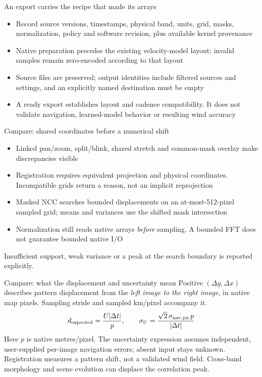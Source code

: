 \documentclass[aspectratio=169,11pt]{beamer}
\newcommand{\currevsec}{}
\newcommand{\revsec}[1]{\gdef\currevsec{#1}}
\begin{document}
\begin{frame}{An export carries the recipe that made its arrays}
  \revsec{4.19}
\begin{itemize}
    \item Record source versions, timestamps, physical band, units, grid, masks, normalization, policy and software revision, plus available kernel provenance
    \item Native preparation precedes the existing velocity-model layout; invalid samples remain zero-encoded according to that layout
    \item Source files are preserved; output identities include filtered sources and settings, and an explicitly named destination must be empty
    \item A ready export establishes layout and cadence compatibility. It does not validate navigation, learned-model behavior or resulting wind accuracy
  \end{itemize}
\end{frame}

\begin{frame}{Compare: shared coordinates before a numerical shift}
  \revsec{4.19}
\begin{itemize}
    \item Linked pan/zoom, split/blink, shared stretch and common-mask overlay make discrepancies visible
    \item Registration requires equivalent projection and physical coordinates. Incompatible grids return a reason, not an implicit reprojection
    \item Masked NCC searches bounded displacements on an at-most-512-pixel sampled grid; means and variances use the shifted mask intersection
    \item Normalization still reads native arrays \emph{before} sampling. A bounded FFT does not guarantee bounded native I/O
  \end{itemize}
  Insufficient support, weak variance or a peak at the search boundary is reported explicitly.
\end{frame}

\begin{frame}{Compare: what the displacement and uncertainty mean}
  \revsec{4.19}
Positive $(\Delta y,\Delta x)$ describes pattern displacement from the \emph{left image to the right image}, in native map pixels. Sampling stride and sampled km/pixel accompany it.
  \[
    d_{\rm expected}=\frac{U|\Delta t|}{p},\qquad
    \sigma_U=\frac{\sqrt{2}\,\sigma_{\rm nav,px}\,p}{|\Delta t|}
  \]
  \small Here $p$ is native metres/pixel. The uncertainty expression assumes independent, user-supplied per-image navigation errors; absent input stays unknown.
  \vspace{0.2cm}
  \normalsize Registration measures a pattern shift, not a validated wind field. Cross-band morphology and scene evolution can displace the correlation peak.
\end{frame}
\end{document}
